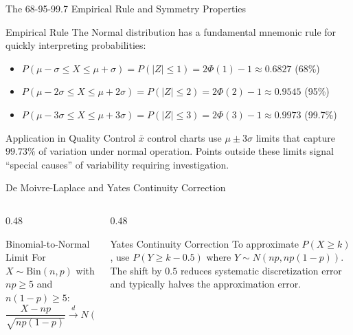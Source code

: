 \documentclass[aspectratio=169,xcolor={dvipsnames,table}]{beamer}
\begin{document}
\begin{frame}{The 68-95-99.7 Empirical Rule and Symmetry Properties}
	\vspace{-0.15cm}
	\begin{block}{Empirical Rule}
		\footnotesize
		The Normal distribution has a fundamental mnemonic rule for quickly interpreting probabilities:
		\begin{itemize}\itemsep=0.06cm
			\item $P(\mu - \sigma \le X \le \mu + \sigma) = P(|Z| \le 1) = 2\Phi(1) - 1 \approx 0.6827$ (68\%)
			\item $P(\mu - 2\sigma \le X \le \mu + 2\sigma) = P(|Z| \le 2) = 2\Phi(2) - 1 \approx 0.9545$ (95\%)
			\item $P(\mu - 3\sigma \le X \le \mu + 3\sigma) = P(|Z| \le 3) = 2\Phi(3) - 1 \approx 0.9973$ (99.7\%)
		\end{itemize}
	\end{block}
	\vspace{-0.1cm}
	\pause
	\begin{alertblock}{Application in Quality Control}
		\footnotesize
		$\bar{x}$ control charts use $\mu \pm 3\sigma$ limits that capture $99.73\%$ of variation under normal operation. Points outside these limits signal ``special causes'' of variability requiring investigation.
	\end{alertblock}
\end{frame}

\begin{frame}{De Moivre-Laplace and Yates Continuity Correction}
	\vspace{-0.15cm}
	\begin{columns}[T]
		\begin{column}{0.48\textwidth}
			\begin{block}{Binomial-to-Normal Limit}
				\footnotesize
				For $X \sim \text{Bin}(n, p)$ with $np \ge 5$ and $n(1-p) \ge 5$:
				$$\dfrac{X - np}{\sqrt{np(1-p)}} \xrightarrow{d} N(0, 1) \quad \text{as } n \to \infty$$
			\end{block}
		\end{column}
		\begin{column}{0.48\textwidth}
			\begin{alertblock}{Yates Continuity Correction}
				\footnotesize
				To approximate $P(X \ge k)$, use $P(Y \ge k - 0.5)$ where $Y \sim N(np, np(1-p))$. The shift by $0.5$ reduces systematic discretization error and typically halves the approximation error.
			\end{alertblock}
		\end{column}
	\end{columns}
\end{frame}
\end{document}
